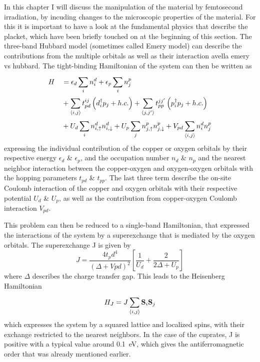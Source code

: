 In this chapter I will discuss the manipulation of the material by femtosecond irradiation, by incuding changes to the microscopic properties of the material.
For this it is important to have a look at the fundamental physics that describe the  placket, which have been briefly touched on at the beginning of this section.
The three-band Hubbard model (sometimes called Emery model) can describe the contributions from the multiple orbitals as well as their interaction\cite{} avella emery vs hubbard.
The tight-binding Hamiltonian of the system can then be written as
\begin{equation}
\begin{split}
	H &\quad = \epsilon_d \sum_{i}^{} n_i^d + \epsilon_p \sum_{i}^{} n_j^p \\
	  &\quad + \sum_{\braket{i,j}}^{} t_{pd}^{ij} \left(d_i^\dagger p_j + h.c.\right) + \sum_{\braket{j,j'}}^{} t_{pp}^{jj'} \left(p_i^\dagger p_j + h.c.\right)\\
	  &\quad + U_d \sum_{i}^{} n_{i,\uparrow}^d n_{i,\downarrow}^d + U_p \sum_{j}^{} n_{j,\uparrow}^p n_{j,\downarrow}^p + V_{pd} \sum_{\braket{i,j}}^{} n_i^d n_j^p
\end{split}
\end{equation}
expressing the individual contribution of the copper or oxygen orbitals by their respective energy $\epsilon_d$ \& $\epsilon_p$, and the occupation number $n_d$ \& $n_p$ and the nearest neighbor interaction between the copper-oxygen and oxygen-oxygen orbitals with the hopping parameters $t_{pd}$ \& $t_{pp}$.
The last three term describe the on-site Coulomb interaction of the copper and oxygen orbitals with their respective potential $U_d$ \& $U_p$, as well as the contribution from copper-oxygen Coulomb interaction $V_{pd}$.

This problem can then be reduced to a single-band Hamiltonian, that expressed the interactions of the system by a superexchange that is mediated by the oxygen orbitals.
The superexchange J is given by
\begin{equation}
	J= \frac{4t_pd^4}{\left(\Delta + Vpd \right)^2} \left[\frac{1}{U_d} + \frac{2}{2\Delta + U_p}\right]
\end{equation}
where $\Delta$ describes the charge transfer gap.
This leads to the Heisenberg Hamiltonian
\begin{equation}
	H_J = J \sum_{\braket{i,j}}^{} \mathbf{S}_i \mathbf{S}_j
\end{equation}
which expresses the system by a squared lattice and localized spins, with their exchange restricted to the nearest neighbors.
In the case of the cuprates, J is positive with a typical value around \qty{0.1}{\electronvolt}, which gives the antiferromagnetic order that was already mentioned earlier.

